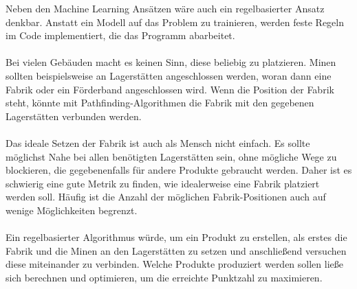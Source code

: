 Neben den Machine Learning Ansätzen wäre auch ein regelbasierter Ansatz denkbar. Anstatt ein Modell auf das Problem zu trainieren, werden feste Regeln im Code implementiert, die das Programm abarbeitet.
\\\\
Bei vielen Gebäuden macht es keinen Sinn, diese beliebig zu platzieren. Minen sollten beispielsweise an Lagerstätten angeschlossen werden, woran dann eine Fabrik oder ein Förderband angeschlossen wird. Wenn die Position der Fabrik steht, könnte mit Pathfinding-Algorithmen die Fabrik mit den gegebenen Lagerstätten verbunden werden.
\\\\
Das ideale Setzen der Fabrik ist auch als Mensch nicht einfach. Es sollte möglichst Nahe bei allen benötigten Lagerstätten sein, ohne mögliche Wege zu blockieren, die gegebenenfalls für andere Produkte gebraucht werden. Daher ist es schwierig eine gute Metrik zu finden, wie idealerweise eine Fabrik platziert werden soll. Häufig ist die Anzahl der möglichen Fabrik-Positionen auch auf wenige Möglichkeiten begrenzt.
\\\\
Ein regelbasierter Algorithmus würde, um ein Produkt zu erstellen, als erstes die Fabrik und die Minen an den Lagerstätten zu setzen und anschließend versuchen diese miteinander zu verbinden. 
Welche Produkte produziert werden sollen ließe sich berechnen und optimieren, um die erreichte Punktzahl zu maximieren.
